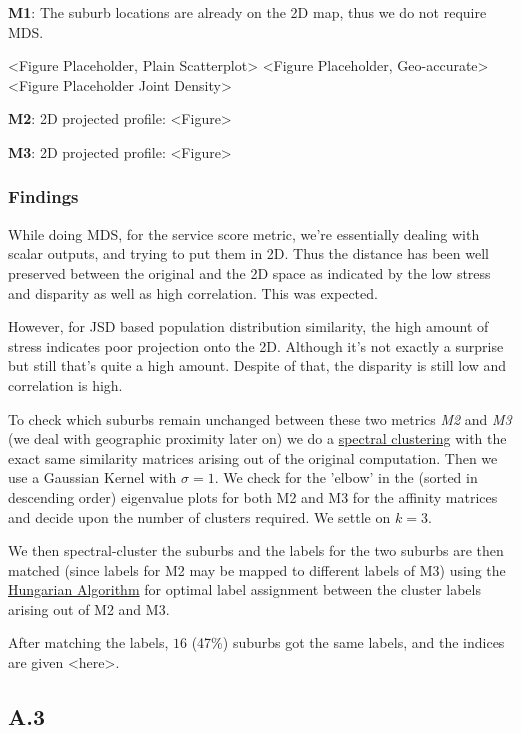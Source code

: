 \documentclass[
	a4paper, %
	10pt, %
	unnumberedsections, %
	twoside, %
]{LTJournalArticle}
\begin{document}
\textbf{M1}: The suburb locations are already on the 2D map, thus we do not require MDS. 

<Figure Placeholder, Plain Scatterplot> <Figure Placeholder, Geo-accurate> <Figure Placeholder Joint Density>

\textbf{M2}: 2D projected profile: <Figure>

\textbf{M3}: 2D projected profile: <Figure>


\subsubsection{Findings}

While doing MDS, for the service score metric, we're essentially dealing with scalar outputs, and trying to put them in 2D. Thus the distance has been well preserved between the original and the 2D space as indicated by the low stress and disparity as well as high correlation. This was expected.

However, for JSD based population distribution similarity, the high amount of stress indicates poor projection onto the 2D. Although it's not exactly a surprise but still that's quite a high amount. Despite of that, the disparity is still low and correlation is high. 


To check which suburbs remain unchanged between these two metrics \textit{M2} and \textit{M3} (we deal with geographic proximity later on) we do a \href{https://en.wikipedia.org/wiki/Spectral_clustering}{spectral clustering} with the exact same similarity matrices arising out of the original computation. Then we use a Gaussian Kernel with $\sigma=1$. We check for the 'elbow' in the (sorted in descending order) eigenvalue plots for both M2 and M3 for the affinity matrices and decide upon the number of clusters required. We settle on $k=3$. 

We then spectral-cluster the suburbs and the labels for the two suburbs are then matched (since labels for M2 may be mapped to different labels of M3) using the \href{https://en.wikipedia.org/wiki/Hungarian_algorithm}{Hungarian Algorithm} for optimal label assignment between the cluster labels arising out of M2 and M3. 

After matching the labels, $16$ (47\%) suburbs got the same labels, and the indices are given <here>.



\subsection{A.3}
\end{document}
